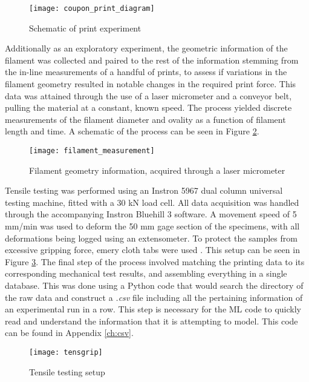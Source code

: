 \documentclass[main.tex]{subfiles}
\begin{document}
\begin{figure}[!htbp]
	\center
	\texttt{[image: coupon\_print\_diagram]}
	\caption{Schematic of print experiment} \label{fig:print_dia}
\end{figure}

Additionally as an exploratory experiment, the geometric information of the filament was collected and paired to the rest of the information stemming from the in-line measurements of a handful of prints, to assess if variations in the filament geometry resulted in notable changes in the required print force. This data was attained through the use of a laser micrometer and a conveyor belt, pulling the material at a constant, known speed. The process yielded discrete measurements of the filament diameter and ovality as a function of filament length and time. A schematic of the process can be seen in Figure \ref{fig:FD}.  

\begin{figure}[!htbp]
	\center
	\texttt{[image: filament\_measurement]}
	\caption{Filament geometry information, acquired through a laser micrometer } \label{fig:FD}
\end{figure}

Tensile testing was performed using an Instron 5967 dual column universal testing machine, fitted with a 30 kN load cell. All data acquisition was handled through the accompanying Instron Bluehill 3 software. A movement speed of 5 mm/min was used to deform the 50 mm gage section of the specimens, with all deformations being logged using an extensometer. To protect the samples from excessive gripping force, emery cloth tabs were used \cite{Capote2017}. This setup can be seen in Figure \ref{fig:testsetup}. The final step of the process involved matching the printing data to its corresponding mechanical test results, and assembling everything in a single database. This was done using a Python code that would search the directory of the raw data and construct a \emph{.csv} file including all the pertaining information of an experimental run in a row. This step is necessary for the ML code to quickly read and understand the information that it is attempting to model. This code can be found in Appendix \ref{ch:csv}. 

\begin{figure}[h]
	\center
	\texttt{[image: tensgrip]}
	\caption{Tensile testing setup} \label{fig:testsetup}
\end{figure} 
\end{document}
